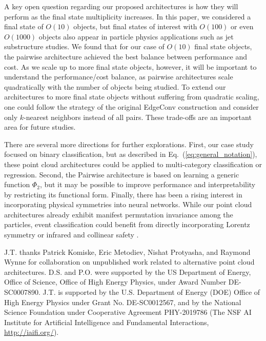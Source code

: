 \documentclass[aps,prd,twocolumn,superscriptaddress,floatfix,longbibliography,preprintnumbers,nofootinbib]{revtex4-1} %
\DeclareRobustCommand{\Eq}[1]{Eq.~(\ref{eq:#1})}
\newcommand{\neww}[1]{{{#1}}}
\begin{document}
\neww{
A key open question regarding our proposed architectures is how they will perform as the final state multiplicity increases. 
%
In this paper, we considered a final state of $O(10)$ objects, but final states of interest with $O(100)$ or even $O(1000)$ objects also appear in particle physics applications such as jet substructure studies. 
%
We found that for our case of $O(10)$ final state objects, the pairwise architecture achieved the best balance between performance and cost. 
%
As we scale up to more final state objects, however, it will be important to understand the performance/cost balance, as pairwise architectures scale quadratically with the number of objects being studied. 
%
To extend our architectures to more final state objects without suffering from quadratic scaling, one could follow the strategy of the original EdgeConv construction \cite{Wang:2018nkf} and consider only $k$-nearest neighbors instead of all pairs. 
%
These trade-offs are an important area for future studies.
} 

There are several more directions for further explorations.
%
First, our case study focused on binary classification, but as described in \Eq{general_notation}, these point cloud architectures could be applied to multi-category classification or regression.
%
%
Second, the Pairwise architecture is based on learning a generic function $\Phi_2$, but it may be possible to improve performance and interpretability by restricting its functional form.
%
Finally, there has been a rising interest in incorporating physical symmetries into neural networks.
%
While our point cloud architectures already exhibit manifest permutation invariance among the particles, event classification could benefit from directly incorporating Lorentz symmetry \cite{Butter:2017cot, Erdmann:2018shi, Bogatskiy:2020tje, Gong:2022lye, Bogatskiy:2022hub, Qiu:2022xvr} or infrared and collinear safety \cite{Komiske:2018cqr, Dolan:2020qkr, Chakraborty:2019imr, Chakraborty:2020yfc, Konar:2021zdg, Romero:2021qlf, Atkinson:2022uzb}.


\begin{acknowledgments}
%
J.T. thanks Patrick Komiske, Eric Metodiev, Nishat Protyasha, and Raymond Wynne for collaboration on unpublished work related to alternative point cloud architectures. 
%
D.S. and P.O. were supported by the US Department of Energy, Office of Science, Office of High Energy Physics, under Award Number DE-SC0007890.
%
J.T. is supported by the U.S. Department of Energy (DOE) Office of High Energy Physics under Grant No. DE-SC0012567, and by the National Science Foundation under Cooperative Agreement PHY-2019786 (The NSF AI Institute for Artificial Intelligence and Fundamental Interactions, \url{http://iaifi.org/}). 
%
\end{acknowledgments}
\end{document}
